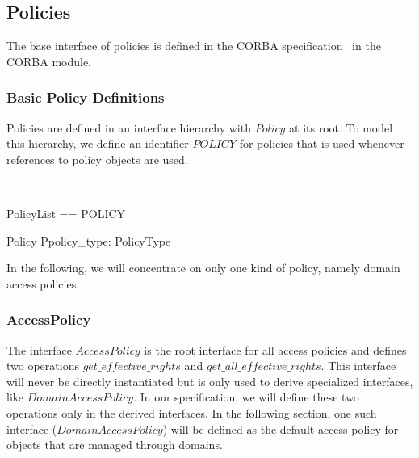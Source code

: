 \subsection{Policies} \label{sec:policies}

The base interface of policies is defined in the CORBA
specification~\cite{omg:CORBA:2.4:2000} in the CORBA module.

\vspace{2ex}

\subsubsection{Basic Policy Definitions}
Policies are defined in an interface hierarchy with $Policy$ at its root.  To
model this hierarchy, we define an identifier $POLICY$ for policies that is used
whenever references to policy objects are used.
  
\begin{zedgroup}
  \begin{zed}
    [ POLICY ] \\
  \end{zed}
  \begin{zed}
    PolicyList == \seq POLICY \\
  \end{zed}  
  \begin{schema}{Policy}
    Ppolicy\_type: PolicyType \\
  \end{schema}
\end{zedgroup}

In the following, we will concentrate on only one kind of policy, namely domain
access policies.

\subsubsection{AccessPolicy \label{sec:AccessPolicy}}
The interface $AccessPolicy$ is the root interface for all access policies and
defines two operations $get\_effective\_rights$ and
$get\_all\_effective\_rights$.  This interface will never be directly
instantiated but is only used to derive specialized interfaces, like
$DomainAccessPolicy$.  In our specification, we will define these two operations
only in the derived interfaces.  In the following section, one such interface
($DomainAccessPolicy$) will be defined as the default access policy for objects
that are managed through domains.


